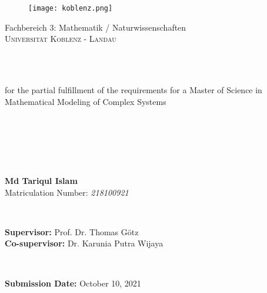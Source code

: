 \thispagestyle{plain}
\begin{spacing}{1.65}
\begin{figure}[H]
\centering
\texttt{[image: koblenz.png]}
\end{figure}

{\begin{center}
Fachbereich 3: Mathematik / Naturwissenschaften\\
\Large{\textsc{Universit\"at Koblenz - Landau}} \\
\end{center}}
~\\
\begin{center}
\textsc{}\\
for the partial fulfillment of the requirements for a Master of Science in\\
\textsf{\Large{Mathematical Modeling of Complex Systems}}\\
\end{center}
~\\
\begin{spacing}{2.5}
\begin{center}
{\huge \textbf{}}\\
\end{center}
\end{spacing}
~\\
\begin{center}
\textbf{\Large{Md Tariqul Islam}}\\
\large{\textmd{Matriculation Number:} \textsl{218100921}}\\
\end{center}
~\\
\begin{center}
\textbf{Supervisor:} Prof. Dr. Thomas G\"otz \\
\textbf{Co-supervisor:} Dr. Karunia Putra Wijaya\\
\end{center}
~\\
\begin{center}
\textbf{Submission Date:} October 10, 2021
\end{center}
\end{spacing}
\thispagestyle{empty}
\pagebreak